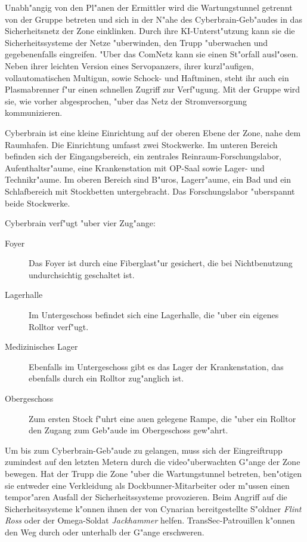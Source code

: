 Unabh"angig von den Pl"anen der Ermittler wird \xl{} die Wartungstunnel getrennt von der Gruppe betreten und sich in der N"ahe des Cyberbrain-Geb"audes in das Sicherheitsnetz der Zone einklinken. Durch ihre KI-Unterst"utzung kann sie die Sicherheitssysteme der Netze "uberwinden, den Trupp "uberwachen und gegebenenfalls eingreifen. "Uber das ComNetz kann sie einen St"orfall ausl"osen. Neben ihrer leichten Version eines Servopanzers, ihrer kurzl"aufigen, vollautomatischen Multigun, sowie Schock- und Haftminen, steht ihr auch ein Plasmabrenner f"ur einen schnellen Zugriff zur Verf"ugung. Mit der Gruppe wird sie, wie vorher abgesprochen, "uber das Netz der Stromversorgung kommunizieren.

Cyberbrain ist eine kleine Einrichtung auf der oberen Ebene der Zone, nahe dem Raumhafen. Die Einrichtung umfasst zwei Stockwerke. Im unteren Bereich befinden sich der Eingangsbereich, ein zentrales Reinraum-Forschungslabor, Aufenthaltsr"aume, eine Krankenstation mit OP-Saal sowie Lager- und Technikr"aume. Im oberen Bereich sind B"uros, Lagerr"aume, ein Bad und ein Schlafbereich mit Stockbetten untergebracht. Das Forschungslabor "uberspannt beide Stockwerke.

Cyberbrain verf"ugt "uber vier Zug"ange:

\begin{description}
	\item[Foyer] Das Foyer ist durch eine Fiberglast"ur gesichert, die bei Nichtbenutzung undurchsichtig geschaltet ist.
	\item[Lagerhalle] Im Untergeschoss befindet sich eine Lagerhalle, die "uber ein eigenes Rolltor verf"ugt.
	\item[Medizinisches Lager] Ebenfalls im Untergeschoss gibt es das Lager der Krankenstation, das ebenfalls durch ein Rolltor zug"anglich 		ist.
	\item[Obergeschoss] Zum ersten Stock f"uhrt eine au\3en gelegene Rampe, die "uber ein Rolltor den Zugang zum Geb"aude im Obergeschoss 	
		gew"ahrt.
\end{description}

Um bis zum Cyberbrain-Geb"aude zu gelangen, muss sich der Eingreiftrupp zumindest auf den letzten Metern durch die video"uberwachten G"ange der Zone bewegen. Hat der Trupp die Zone "uber die Wartungstunnel betreten, ben"otigen sie entweder eine Verkleidung als Dockbunner-Mitarbeiter oder m"ussen einen tempor"aren Ausfall der Sicherheitssysteme provozieren. Beim Angriff auf die Sicherheitssysteme k"onnen ihnen der von Cynarian bereitgestellte S"oldner \emph{Flint Ross} oder der Omega-Soldat \emph{Jackhammer} helfen. TransSec-Patrouillen k"onnen den Weg durch oder unterhalb der G"ange erschweren.

